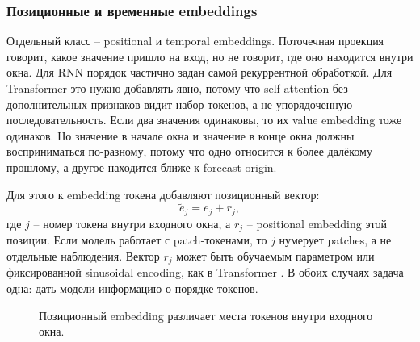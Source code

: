 \documentclass[12pt,fleqn]{article}
\begin{document}
\subsubsection{Позиционные и временные embeddings}

Отдельный класс -- positional и temporal embeddings.
Поточечная проекция говорит, какое значение пришло на вход, но не говорит, где оно находится внутри окна.
Для RNN порядок частично задан самой рекуррентной обработкой.
Для Transformer это нужно добавлять явно, потому что self-attention без дополнительных признаков видит набор токенов, а не упорядоченную последовательность.
Если два значения одинаковы, то их value embedding тоже одинаков.
Но значение в начале окна и значение в конце окна должны восприниматься по-разному, потому что одно относится к более далёкому прошлому, а другое находится ближе к forecast origin.

Для этого к embedding токена добавляют позиционный вектор:
\begin{equation}
  \widetilde{e}_j = e_j + r_j,
\end{equation}
где $j$ -- номер токена внутри входного окна, а $r_j$ -- positional embedding этой позиции.
Если модель работает с patch-токенами, то $j$ нумерует patches, а не отдельные наблюдения.
Вектор $r_j$ может быть обучаемым параметром или фиксированной sinusoidal encoding, как в Transformer \cite{vaswani2017}.
В обоих случаях задача одна: дать модели информацию о порядке токенов.

\begin{figure}[!ht]
\centering
{}
\caption{Позиционный embedding различает места токенов внутри входного окна.}
\end{figure}
\end{document}
